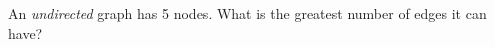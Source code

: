 \begin{prob}
    An \emph{undirected} graph has 5 nodes. What is the greatest number of
    edges it can have?


\end{prob}
